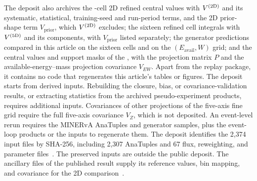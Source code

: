 \label{app:release-scope} The deposit also archives the -cell 2D refined central values with $V^{(2\mathrm{D})}$ and its systematic, statistical, training-seed and run-period terms, and the 2D prior-shape term $V_{\mathrm{prior}}$, which $V^{(2\mathrm{D})}$ excludes; the sixteen refined cell integrals with $V^{(5\mathrm{D})}$ and its components, with $V_{\mathrm{prior}}$ listed separately; the generator predictions compared in this article on the sixteen cells and on the $(E_{\mathrm{avail}},W)$ grid; and the central values and support masks of the \resFiveAxis{}, with the projection matrix $P$ and the available-energy--mass projection covariance $V_{EW}$. Apart from the replay package, it contains no code that regenerates this article's tables or figures. The deposit starts from derived inputs. Rebuilding the closure, bias, or covariance-validation results, or extracting statistics from the archived pseudo-experiment products, requires additional inputs. Covariances of other projections of the five-axis fine grid require the full five-axis covariance $V_Z$, which is not deposited. An event-level rerun requires the MINERvA AnaTuples and generator samples, plus the event-loop products or the inputs to regenerate them. The deposit identifies the 2,374 input files by SHA-256, including 2,307 AnaTuples and 67 flux, reweighting, and parameter files~\cite{AnaTuplePreservation2026}. The preserved inputs are outside the public deposit. The ancillary files of the published result supply its reference values, bin mapping, and covariance for the 2D comparison~\cite{MINERvA:2021owq}.

